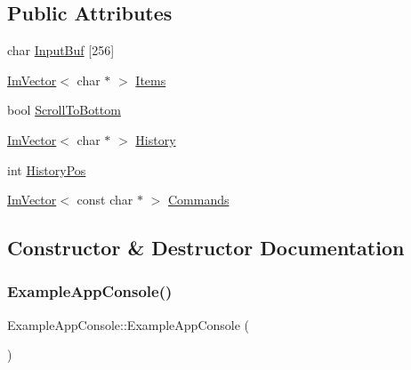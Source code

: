 \subsection*{Public Attributes}
\begin{DoxyCompactItemize}
\item 
char \mbox{\hyperlink{struct_example_app_console_ab30accde81ae6833bd2ecf35f43f01ab}{Input\+Buf}} \mbox{[}256\mbox{]}
\item 
\mbox{\hyperlink{class_im_vector}{Im\+Vector}}$<$ char $\ast$ $>$ \mbox{\hyperlink{struct_example_app_console_acfde7d45fb733ac72d5d500168557b36}{Items}}
\item 
bool \mbox{\hyperlink{struct_example_app_console_a69b1406795fd71a3757761b0767ea1c5}{Scroll\+To\+Bottom}}
\item 
\mbox{\hyperlink{class_im_vector}{Im\+Vector}}$<$ char $\ast$ $>$ \mbox{\hyperlink{struct_example_app_console_a11c7fa54e744288f3606e4d6521d6345}{History}}
\item 
int \mbox{\hyperlink{struct_example_app_console_a2508db0a7d205947cea65b141d4ed589}{History\+Pos}}
\item 
\mbox{\hyperlink{class_im_vector}{Im\+Vector}}$<$ const char $\ast$ $>$ \mbox{\hyperlink{struct_example_app_console_a1eebee69cceb0345cf9d9b6e6beb9d03}{Commands}}
\end{DoxyCompactItemize}


\subsection{Constructor \& Destructor Documentation}
\mbox{\label{struct_example_app_console_a405521e6aa8f97954b67315baf8d6147}} 
\subsubsection{\texorpdfstring{Example\+App\+Console()}{ExampleAppConsole()}}
{\footnotesize\ttfamily Example\+App\+Console\+::\+Example\+App\+Console (\begin{DoxyParamCaption}{ }\end{DoxyParamCaption})\hspace{0.3cm}{\ttfamily [inline]}}

